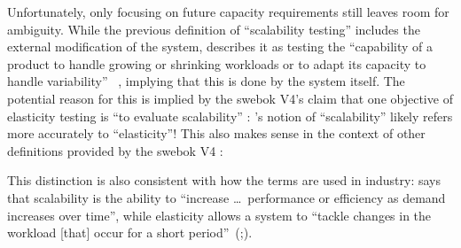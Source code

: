 Unfortunately, only focusing on future capacity requirements still leaves room
for ambiguity. While the previous definition of ``scalability testing'' includes
the external modification of the system, \ifnotpaper \citeauthor{ISO_IEC2023a}
\else \cite{ISO_IEC2023a} \fi describes it as
testing the ``capability of a product to handle growing or shrinking
workloads or to adapt its capacity to handle variability''%
\ifnotpaper\ \citeyearpar{ISO_IEC2023a}\fi, implying that this is done by the
system itself. The potential reason for this is implied by the \acs{swebok} V4's
claim that one objective of elasticity testing is ``to evaluate scalability''
\citep[p.~5-9]{SWEBOK2024}: \ifnotpaper \citeauthor{ISO_IEC2023a}%
\else \cite{ISO_IEC2023a}\fi's notion of ``scalability''
likely refers more accurately to ``elasticity''! This also makes sense in the
context of other definitions provided by the \acs{swebok} V4 \citep{SWEBOK2024}:
This distinction is also consistent with how the terms are used in industry:
\ifnotpaper \citeauthor{Pandey2023} \else \cite{Pandey2023} \fi says
that scalability is the ability to ``increase
\dots\ performance or efficiency as demand increases over time'', while
elasticity allows a system to ``tackle changes in the workload [that] occur for
a short period''\ifnotpaper\ (\citeyear{Pandey2023};)\fi.


